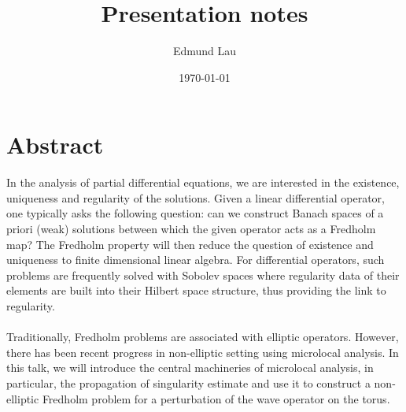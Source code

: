 \documentclass{article}
\title{Presentation notes}
\author{Edmund Lau}
\date{\today}
\begin{document}
\maketitle


\section*{Abstract}


In the analysis of partial differential equations, we are interested in the existence, uniqueness and regularity of the solutions. Given a linear differential operator, one typically asks the following question: can we construct Banach spaces of a priori (weak) solutions between which the given operator acts as a Fredholm map? The Fredholm property will then reduce the question of existence and uniqueness to finite dimensional linear algebra. For differential operators, such problems are frequently solved with Sobolev spaces where regularity data of their elements are built into their Hilbert space structure, thus providing the link to regularity. \\
\\
Traditionally, Fredholm problems are associated with elliptic operators. However, there has been recent progress in non-elliptic setting using microlocal analysis. In this talk, we will introduce the central machineries of microlocal analysis, in particular, the propagation of singularity estimate and use it to construct a non-elliptic Fredholm problem for a perturbation of the wave operator on the torus.
\end{document}
